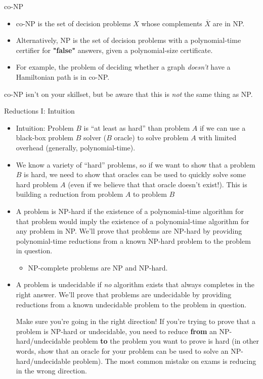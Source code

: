\documentclass{beamer}
\begin{document}
\begin{frame}[t]{co-NP}
    \begin{itemize}
        \item \alert{co-NP} is the set of decision problems $X$ whose complements  $\overline{X}$ are in NP.
        \item Alternatively, NP is the set of decision problems with a polynomial-time certifier for \textbf{"false"} answers, given a polynomial-size certificate.
        \item For example, the problem of deciding whether a graph \emph{doesn't} have a Hamiltonian path is in co-NP.
    \end{itemize}
    co-NP isn't on your skillset, but be aware that this is \emph{not} the same thing as NP.
\end{frame}

\begin{frame}[t]{Reductions I: Intuition}
    \begin{itemize}
        \item \alert{Intuition:} Problem $B$ is ``at least as hard'' than problem $A$ if we can use a black-box problem $B$ solver ($B$ oracle) to solve problem $A$ with limited overhead (generally, polynomial-time).
        \item \pause We know a variety of ``hard'' problems, so if we want to show that a problem $B$ is hard, we need to show that oracles can be used to quickly solve some hard problem $A$ (even if we believe that that oracle doesn't exist!). This is building a \alert{reduction from} problem $A$ \alert{to} problem $B$
        \item \pause A problem is \alert{NP-hard} if the existence of a polynomial-time algorithm for that problem would imply the existence of a polynomial-time algorithm for any problem in NP. We'll prove that problems are NP-hard by providing \alert{polynomial-time} reductions from a known NP-hard problem to the problem in question.
        \begin{itemize}
            \item \alert{NP-complete} problems are NP and NP-hard.
        \end{itemize}
        \item \pause A problem is \alert{undecidable} if \textit{no} algorithm exists that always completes in the right answer.  We'll prove that problems are undecidable by providing reductions from a known undecidable problem to the problem in question.
        \pause \begin{alertblock}{Make sure you're going in the right direction!}
            If you're trying to prove that a problem is NP-hard or undecidable, you need to reduce \textbf{from} an NP-hard/undecidable problem \textbf{to} the problem you want to prove is hard (in other words, show that an oracle for your problem can be used to solve an NP-hard/undecidable problem). The most common mistake on exams is reducing in the wrong direction.
        \end{alertblock}
    \end{itemize}
\end{frame}
\end{document}

